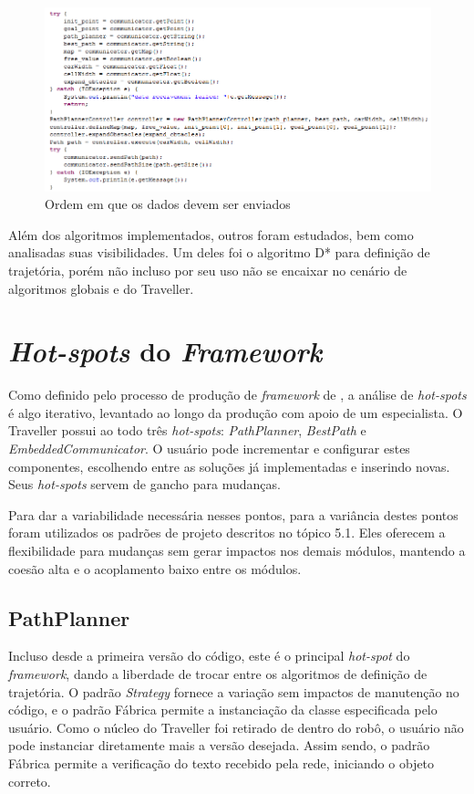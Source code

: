 \begin{figure}[h]
	\centering
	\label{fig33}
		\includegraphics[keepaspectratio=true,scale=0.7]{figuras/main.PNG}
	\caption{Ordem em que os dados devem ser enviados}
\end{figure}

Além dos algoritmos implementados, outros foram estudados, bem como analisadas suas visibilidades. Um deles foi o algoritmo D* \cite{Ferguson__2005_5119} para definição de trajetória, porém não incluso por seu uso não se encaixar no cenário de algoritmos globais e do Traveller.

\section{\textit{Hot-spots} do \textit{Framework}}

Como definido pelo processo de produção de \textit{framework} de \cite{Fayad1999}, a análise de \textit{hot-spots} é algo iterativo, levantado ao longo da produção com apoio de um especialista. O Traveller possui ao todo três \textit{hot-spots}: \textit{PathPlanner}, \textit{BestPath} e \textit{EmbeddedCommunicator}. O usuário pode incrementar e configurar estes componentes, escolhendo entre as soluções já implementadas e inserindo novas. Seus \textit{hot-spots} servem de gancho para mudanças.

Para dar a variabilidade necessária nesses pontos, para a variância destes pontos foram utilizados os padrões de projeto descritos no tópico 5.1. Eles oferecem a flexibilidade para mudanças sem gerar impactos nos demais módulos, mantendo a coesão alta e o acoplamento baixo entre os módulos.

\subsection{PathPlanner}

Incluso desde a primeira versão do código, este é o principal \textit{hot-spot} do \textit{framework}, dando a liberdade de trocar entre os algoritmos de definição de trajetória. O padrão \textit{Strategy} fornece a variação sem impactos de manutenção no código, e o padrão Fábrica permite a instanciação da classe especificada pelo usuário. Como o núcleo do Traveller foi retirado de dentro do robô, o usuário não pode instanciar diretamente mais a versão desejada. Assim sendo, o padrão Fábrica permite a verificação do texto recebido pela rede, iniciando o objeto correto.

